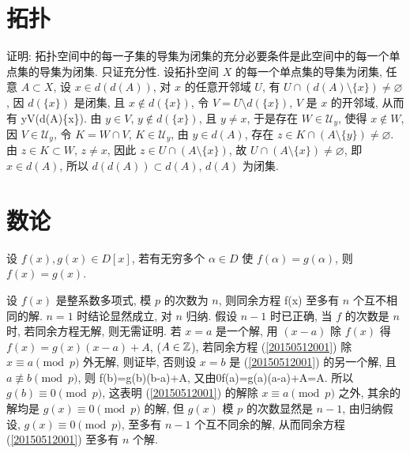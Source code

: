 
\section{拓扑}
证明: 拓扑空间中的每一子集的导集为闭集的充分必要条件是此空间中的每一个单点集的导集为闭集.
\et
\ba
只证充分性. 设拓扑空间 $X$ 的每一个单点集的导集为闭集, 任意 $A\subset X$, 设 $x\in d(d(A))$, 对 $x$ 的任意开邻域 $U$,
有 $U\cap(d(A)\setminus\{x\})\ne\varnothing$, 因 $d(\{x\})$ 是闭集, 且 $x\not\in d(\{x\})$, 令 $V=U\setminus d(\{x\})$, 
$V$ 是 $x$ 的开邻域, 从而有
\bee
y\in V\cap(d(A)\setminus\{x\}).
\eee
由 $y\in V$, $y\not\in d(\{x\})$, 且 $y\ne x$, 于是存在 $W\in\mathscr{U}_y$, 使得 $x\not\in W$, 因 $V\in\mathscr{U}_y$, 
令 $K=W\cap V$, $K\in\mathscr{U}_y$, 由 $y\in d(A)$, 存在 $z\in K\cap(A\setminus\{y\})\ne\varnothing$.
由 $z\in K\subset W$, $z\ne x$, 因此 $z\in U\cap(A\setminus\{x\})$, 故 $U\cap(A\setminus\{x\})\ne\varnothing$,
即 $x\in d(A)$, 所以 $d(d(A))\subset d(A)$, $d(A)$ 为闭集.
\ea


\section{数论}
设 $f(x),g(x)\in D[x]$, 若有无穷多个 $\alpha\in D$ 使 $f(\alpha)=g(\alpha)$, 则 $f(x)=g(x)$.
\et

设 $f(x)$ 是整系数多项式, 模 $p$ 的次数为 $n$, 则同余方程
\be\label{20150512001}
f(x)
\ee
至多有 $n$ 个互不相同的解.
\et
\ba
$n=1$ 时结论显然成立, 对 $n$ 归纳. 假设 $n-1$ 时已正确, 当 $f$ 的次数是 $n$ 时, 若同余方程无解, 则无需证明.
若 $x=a$ 是一个解, 用 $(x-a)$ 除 $f(x)$ 得 $f(x)=g(x)(x-a)+A$, ($A\in\mathbb{Z}$), 若同余方程 (\ref{20150512001}) 除 $x\equiv a\pmod{p}$ 外无解, 则证毕, 
否则设 $x=b$ 是 (\ref{20150512001}) 的另一个解, 且 $a\not\equiv b\pmod{p}$, 则
\equiv f(b)=g(b)(b-a)+A, \textrm{又由}0\equiv f(a)=g(a)(a-a)+A=A.
\eee
所以 $g(b)\equiv0\pmod{p}$, 这表明 (\ref{20150512001}) 的解除 $x\equiv a\pmod{p}$ 之外, 其余的解均是 $g(x)\equiv0\pmod{p}$ 的解, 
但 $g(x)$ 模 $p$ 的次数显然是 $n-1$, 由归纳假设, $g(x)\equiv 0\pmod{p}$, 至多有 $n-1$ 个互不同余的解, 从而同余方程 (\ref{20150512001}) 至多有 $n$ 个解.
\ea

